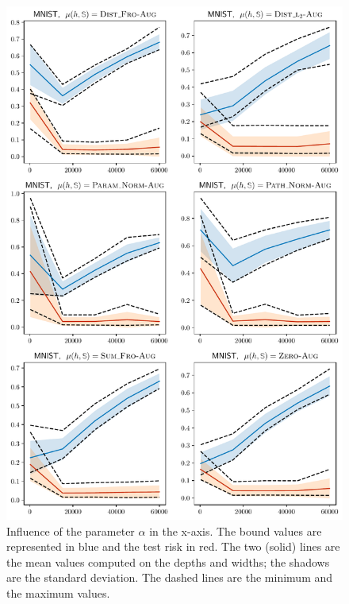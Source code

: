 \begin{noaddcontents}
\begin{figure}
    \centering
    \includegraphics[width=0.77\linewidth]{chapter_7/figures/influence_alpha_mnist_aug.pdf}
    \caption{
    Influence of the parameter $\alpha$ in the x-axis.
    The bound values are represented in blue and the test risk in red. 
    The two (solid) lines are the mean values computed on the depths and widths; the shadows are the standard deviation.
    The dashed lines are the minimum and the maximum values.
    }
    \label{ap:dis-mu:fig:influence-alpha-2}
\end{figure}


\end{noaddcontents}

